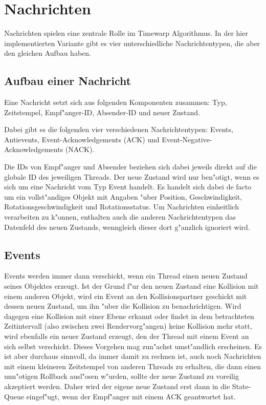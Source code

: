 \documentclass[a4paper, 10pt, openright, parskip, chapterprefix]{scrreprt}
\begin{document}
\section{Nachrichten}
Nachrichten spielen eine zentrale Rolle im Timewarp Algorithmus. In der hier implementierten Variante gibt es vier
unterschiedliche Nachrichtentypen, die aber den gleichen Aufbau haben.
\subsection{Aufbau einer Nachricht}
Eine Nachricht setzt sich aus folgenden Komponenten zusammen: Typ, Zeitstempel, Empf"anger-ID, Absender-ID und neuer
Zustand.

Dabei gibt es die folgenden vier verschiedenen Nachrichtentypen:
Events, Antievents, Event-Acknowledgements (ACK) und Event-Negative-Acknowledgements (NACK).

Die IDs von Empf"anger und Absender beziehen sich dabei jeweils direkt auf die globale ID des jeweiligen Threads. Der
neue Zustand wird nur ben"otigt, wenn es sich um eine Nachricht vom Typ Event handelt. Es handelt sich dabei de facto um
ein vollst"andiges Objekt mit Angaben "uber Position, Geschwindigkeit, Rotationsgeschwindigkeit und Rotationsstatus. Um
Nachrichten einheitlich verarbeiten zu k"onnen, enthalten auch die anderen Nachrichtentypen das Datenfeld des neuen
Zustands, wenngleich dieser dort g"anzlich ignoriert wird.

\subsection{Events}
Events werden immer dann verschickt, wenn ein Thread einen neuen Zustand seines Objektes erzeugt. Ist der Grund f"ur den
neuen Zustand eine Kollision mit einem anderen Objekt, wird ein Event an den Kollisionspartner geschickt mit dessen
neuen Zustand, um ihn "uber
die Kollision zu benachrichtigen. Wird dagegen eine Kollision mit einer Ebene erkannt oder findet in dem betrachteten
Zeitintervall (also zwischen zwei Rendervorg"angen) keine Kollision mehr statt, wird ebenfalls ein neuer Zustand
erzeugt, den der Thread mit einem Event an sich selbst verschickt. Dieses Vorgehen mag zun"achst umst"andlich erscheinen. Es ist aber
durchaus sinnvoll, da immer damit zu rechnen ist, auch noch Nachrichten mit einem kleineren Zeitstempel von anderen
Threads zu erhalten, die dann einen unn"otigen Rollback ausl"osen w"urden, sollte der neue Zustand zu voreilig akzeptiert
werden. Daher wird der eigene neue Zustand erst dann in die State-Queue eingef"ugt, wenn der Empf"anger mit einem ACK
geantwortet hat.
\end{document}
